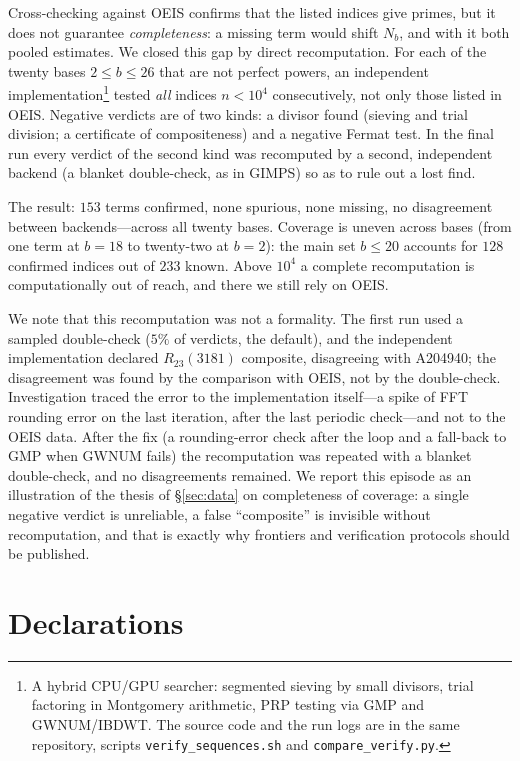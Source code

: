 \documentclass[11pt,a4paper]{article}
\theoremstyle{plain}
\theoremstyle{remark}
\begin{document}
Cross-checking against OEIS confirms that the listed indices give primes, but it
does not guarantee \emph{completeness}: a missing term would shift $N_b$, and
with it both pooled estimates. We closed this gap by direct recomputation. For
each of the twenty bases $2\le b\le26$ that are not perfect powers, an
independent implementation\footnote{A hybrid CPU/GPU searcher: segmented sieving
by small divisors, trial factoring in Montgomery arithmetic, PRP testing via GMP
and GWNUM/IBDWT. The source code and the run logs are in the same repository,
scripts \texttt{verify\_sequences.sh} and \texttt{compare\_verify.py}.} tested
\emph{all} indices $n<10^4$ consecutively, not only those listed in OEIS.
Negative verdicts are of two kinds: a divisor found (sieving and trial division;
a certificate of compositeness) and a negative Fermat test. In the final run every
verdict of the second kind was recomputed by a second, independent backend (a
blanket double-check, as in GIMPS) so as to rule out a lost find.

The result: $153$ terms confirmed, none spurious, none missing, no disagreement
between backends---across all twenty bases. Coverage is uneven across bases
(from one term at $b=18$ to twenty-two at $b=2$): the main set $b\le20$ accounts
for $128$ confirmed indices out of $233$ known. Above $10^4$ a complete
recomputation is computationally out of reach, and there we still rely on OEIS.

We note that this recomputation was not a formality. The first run used a
sampled double-check ($5\%$ of verdicts, the default), and the independent
implementation declared $R_{23}(3181)$ composite, disagreeing with A204940; the
disagreement was found by the comparison with OEIS, not by the double-check.
Investigation traced the error to the implementation itself---a spike of FFT
rounding error on the last iteration, after the last periodic check---and not to
the OEIS data. After the fix (a rounding-error check after the loop and a
fall-back to GMP when GWNUM fails) the recomputation was repeated with a blanket
double-check, and no disagreements remained. We report this episode as an
illustration of the thesis of \S\ref{sec:data} on completeness of coverage: a
single negative verdict is unreliable, a false ``composite'' is invisible without
recomputation, and that is exactly why frontiers and verification protocols
should be published.

\section*{Declarations}
\end{document}
